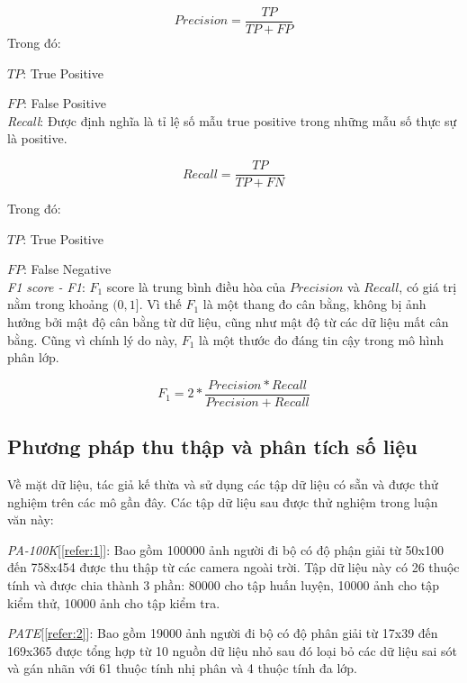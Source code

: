 \begin{equation}
Precision = \frac{TP}{TP + FP}
\end{equation}
\indent{}Trong đó:

\indent{}\indent{}$TP$: True Positive

\indent{}\indent{}$FP$: False Positive\\

\textit{Recall}: Được định nghĩa là tỉ lệ số mẫu true positive trong những mẫu số thực sự là positive.

\begin{equation}
Recall = \frac{TP}{TP + FN}
\end{equation}

\indent{}Trong đó:

\indent{}\indent{}$TP$: True Positive

\indent{}\indent{}$FP$: False Negative\\

\textit{F1 score - F1}: $F_1$ score là trung bình điều hòa của $Precision$ và $Recall$, có giá trị nằm trong khoảng $(0, 1]$. Vì thế $F_1$ là một thang đo cân bằng, không bị ảnh hưởng bởi mật độ cân bằng từ dữ liệu, cũng như mật độ từ các dữ liệu mất cân bằng. Cũng vì chính lý do này, $F_1$ là một thước đo đáng tin cậy trong mô hình phân lớp.

\begin{equation}
F_1 = 2 * \frac{Precision * Recall}{Precision + Recall}
\end{equation}



\subsection{\texorpdfstring{Phương pháp thu thập và phân tích số liệu}{Empty}}
Về mặt dữ liệu, tác giả kế thừa và sử dụng các tập dữ liệu có sẵn và được thử nghiệm trên các mô gần đây. Các tập dữ liệu sau được thử nghiệm trong luận văn này:

\textit{PA-100K}[\ref{refer:1}]: Bao gồm 100000 ảnh người đi bộ có độ phận giải từ 50x100 đến 758x454 được thu thập từ các camera ngoài trời. Tập dữ liệu này có 26 thuộc tính và được chia thành 3 phần: 80000 cho tập huấn luyện, 10000 ảnh cho tập kiểm thử, 10000 ảnh cho tập kiểm tra.

\textit{PATE}[\ref{refer:2}]: Bao gồm 19000 ảnh người đi bộ có độ phân giải từ 17x39 đến 169x365 được tổng hợp từ 10 nguồn dữ liệu nhỏ sau đó loại bỏ các dữ liệu sai sót và gán nhãn với 61 thuộc tính nhị phân và 4 thuộc tính đa lớp.


